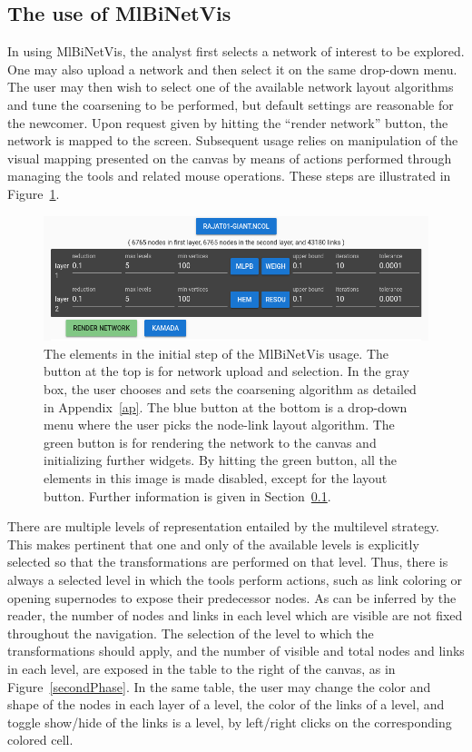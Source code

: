 \documentclass[runningheads]{llncs}
\begin{document}
\subsection{The use of MlBiNetVis}\label{use}
In using MlBiNetVis,
the analyst first selects a network of interest to be explored.
One may also upload a network and then select it on the same drop-down menu.
The user may then wish to select one of the available network layout
algorithms and tune the coarsening to be performed, but default settings are reasonable
for the newcomer.
Upon request given by hitting the ``render network'' button,
the network is mapped to the screen.
Subsequent usage relies on manipulation of the visual mapping presented on the
canvas by means of actions
performed through managing the tools and related mouse operations.
These steps are illustrated in Figure~\ref{initial}.
\begin{figure}[!h]\centering
 \includegraphics[width=\textwidth]{initial_}
  \caption{The elements in the initial step of the MlBiNetVis usage.
  The button at the top is for network upload and selection.
  In the gray box, the user chooses and sets the coarsening algorithm as detailed in Appendix~\ref{ap}.
  The blue button at the bottom is a drop-down menu where the user picks the node-link
  layout algorithm.
  The green button is for rendering the network to the canvas and initializing further widgets.
  By hitting the green button, all the elements in this image is made disabled, except for the layout
  button.
  Further information is given in Section~\ref{use}.
  }\label{initial}
\end{figure}

There are multiple levels of representation entailed by the multilevel strategy.
This makes pertinent that one and only of the available levels is explicitly selected
so that the transformations are performed on that level.
Thus, there is always a selected level in which the tools perform actions, such
as link coloring or opening supernodes to expose their predecessor nodes.
As can be inferred by the reader,
the number of nodes and links in each level which are visible are not fixed throughout the
navigation.
The selection of the level to which the transformations should apply, and the number
of visible and total nodes and links in each level, are exposed in the table to the right
of the canvas, as in Figure~\ref{secondPhase}.
In the same table, the user may change the color and shape of the nodes in each layer of
a level, the color of the links of a level, and toggle show/hide of the links is a level,
by left/right clicks on the corresponding colored cell.
\end{document}

